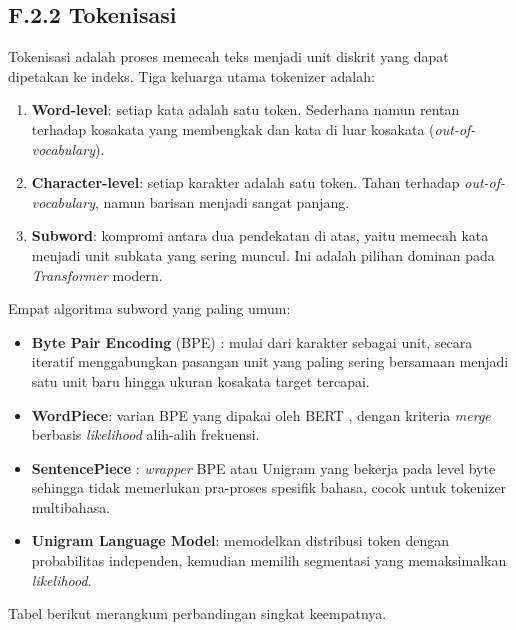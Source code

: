 \subsection*{F.2.2 Tokenisasi}

Tokenisasi adalah proses memecah teks menjadi unit diskrit yang dapat dipetakan ke indeks. Tiga keluarga utama tokenizer adalah:

\begin{enumerate}
    \item \textbf{Word-level}: setiap kata adalah satu token. Sederhana namun rentan terhadap kosakata yang membengkak dan kata di luar kosakata (\textit{out-of-vocabulary}).
    \item \textbf{Character-level}: setiap karakter adalah satu token. Tahan terhadap \textit{out-of-vocabulary}, namun barisan menjadi sangat panjang.
    \item \textbf{Subword}: kompromi antara dua pendekatan di atas, yaitu memecah kata menjadi unit subkata yang sering muncul. Ini adalah pilihan dominan pada \textit{Transformer} modern.
\end{enumerate}

Empat algoritma subword yang paling umum:

\begin{itemize}
    \item \textbf{Byte Pair Encoding} (BPE) \citep{sennrichBPE2016}: mulai dari karakter sebagai unit, secara iteratif menggabungkan pasangan unit yang paling sering bersamaan menjadi satu unit baru hingga ukuran kosakata target tercapai.
    \item \textbf{WordPiece}: varian BPE yang dipakai oleh BERT \citep{devlinBERT2019}, dengan kriteria \textit{merge} berbasis \textit{likelihood} alih-alih frekuensi.
    \item \textbf{SentencePiece} \citep{kudoSentencePiece2018}: \textit{wrapper} BPE atau Unigram yang bekerja pada level byte sehingga tidak memerlukan pra-proses spesifik bahasa, cocok untuk tokenizer multibahasa.
    \item \textbf{Unigram Language Model}: memodelkan distribusi token dengan probabilitas independen, kemudian memilih segmentasi yang memaksimalkan \textit{likelihood}.
\end{itemize}

Tabel berikut merangkum perbandingan singkat keempatnya.

